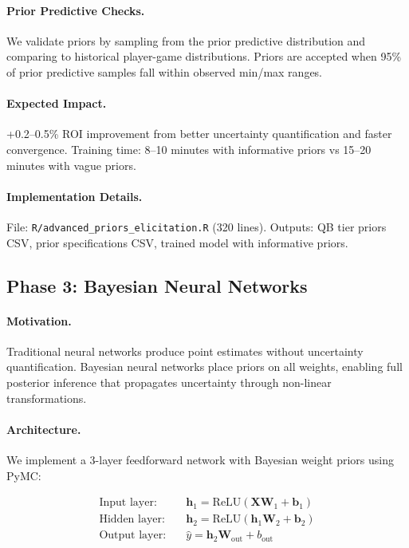 \documentclass[12pt]{report}  %
\numberwithin{equation}{section}
\theoremstyle{plain}
\theoremstyle{definition}
\theoremstyle{remark}
\begin{document}
\paragraph{Prior Predictive Checks.}
We validate priors by sampling from the prior predictive distribution and comparing to historical player-game distributions. Priors are accepted when 95\% of prior predictive samples fall within observed min/max ranges.

\paragraph{Expected Impact.}
+0.2--0.5\% ROI improvement from better uncertainty quantification and faster convergence. Training time: 8--10 minutes with informative priors vs 15--20 minutes with vague priors.

\paragraph{Implementation Details.}
File: \texttt{R/advanced\_priors\_elicitation.R} (320 lines). Outputs: QB tier priors CSV, prior specifications CSV, trained model with informative priors.

\subsection{Phase 3: Bayesian Neural Networks}

\paragraph{Motivation.}
Traditional neural networks produce point estimates without uncertainty quantification. Bayesian neural networks place priors on all weights, enabling full posterior inference that propagates uncertainty through non-linear transformations.

\paragraph{Architecture.}
We implement a 3-layer feedforward network with Bayesian weight priors using PyMC:

\begin{align}
\text{Input layer:} &\quad \mathbf{h}_1 = \text{ReLU}(\mathbf{X} \mathbf{W}_1 + \mathbf{b}_1) \\
\text{Hidden layer:} &\quad \mathbf{h}_2 = \text{ReLU}(\mathbf{h}_1 \mathbf{W}_2 + \mathbf{b}_2) \\
\text{Output layer:} &\quad \hat{y} = \mathbf{h}_2 \mathbf{W}_{\text{out}} + b_{\text{out}}
\end{align}
\end{document}
